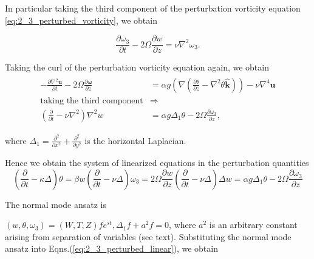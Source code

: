 \documentclass{article}
\begin{document}
In particular taking the third component of the perturbation vorticity equation \ref{eq:2_3_perturbed_vorticity}, we obtain

\begin{equation}\label{eq:2_3_perturbed_vorticity_z}
 \frac{\partial \omega_{3}}{\partial t} - 2\Omega\frac{\partial w}{\partial {z}} = \nu \nabla^{2} \omega_{3}.
\end{equation}

Taking the curl of the perturbation vorticity equation again, we obtain
\begin{align}\label{eq:2_3_curl_perturbed_vorticity}
\begin{split}
 -\frac{\partial \nabla^{2}\boldsymbol{u}}{\partial t} - 2\Omega \frac{\partial \boldsymbol{\omega}}{\partial {z}} &= \alpha g \left(\nabla\left(\frac{\partial \theta}{\partial z} - \nabla^{2} \theta\boldsymbol{\hat{k}}\right) \right) - \nu \nabla^{4} \boldsymbol{u}\\
\textrm{taking the third component} &  \Rightarrow  \\
\left(\frac{\partial}{\partial t} - \nu \nabla^{2}\right) \nabla^{2} w &= \alpha g \Delta_{1} \theta - 2 \Omega \frac{\partial \omega_{3}}{\partial z},
\end{split}
\end{align}

where $\Delta_{1} = \frac{\partial^{2}}{\partial x^{2}} + \frac{\partial^{2}}{\partial y^{2}}$ is the horizontal Laplacian.

Hence we obtain the system of linearized equations in the perturbation quantities
\begin{subequations}\label{eq:2_3_perturbed_linear}
\begin{equation}
 \left(\frac{\partial }{\partial t} - \kappa \Delta \right) \theta = \beta w
 \end{equation}
 \begin{equation}
  \left(\frac{\partial }{\partial t} - \nu \Delta \right) \omega_{3} = 2\Omega\frac{\partial w}{\partial {z}}
 \end{equation}
  \begin{equation}
\left(\frac{\partial }{\partial t} - \nu \Delta \right) \Delta w = \alpha g \Delta_{1} \theta - 2 \Omega \frac{\partial \omega_{3}}{\partial z}
\end{equation}
\end{subequations}

The normal mode ansatz is

$(w, \theta, \omega_{3}) = (W, T, Z)f e^{st}, \Delta_{1} f + a^{2}f = 0$, where $a^{2}$ is an arbitrary constant arising from separation of variables (see text). Substituting the normal mode ansatz into Eqns.(\ref{eq:2_3_perturbed_linear}), we obtain
\end{document}
